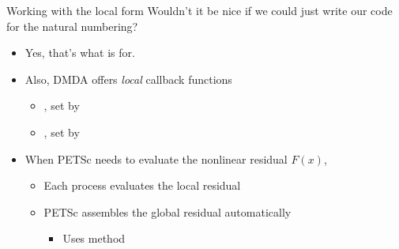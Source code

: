 \begin{frame}{Working with the local form}
  Wouldn't it be nice if we could just write our code for the natural numbering?
  \begin{itemize}
  \item Yes, that's what  is for.
  \item Also, DMDA offers \emph{local} callback functions
    \begin{itemize}
    \item {}, set by 
      
      \medskip
      
    \item {}, set by 
    \end{itemize}

    \bigskip

  \item When PETSc needs to evaluate the nonlinear residual $F(x)$,
    \begin{itemize}
    \item Each process evaluates the local residual

      \medskip

    \item PETSc assembles the global residual automatically
      \begin{itemize}
      \item Uses  method
      \end{itemize}
    \end{itemize}
  \end{itemize}
\end{frame}
